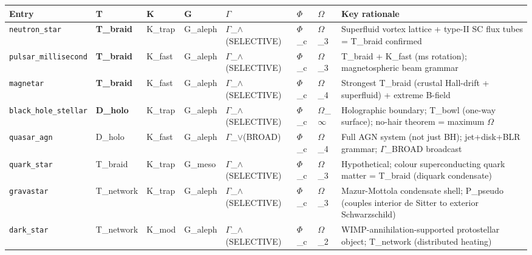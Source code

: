\documentclass[12pt,a4paper]{article}
\begin{document}
\begin{table}[htbp]
\centering
\small
{}
\begin{tabularx}{\textwidth}{>{\centering\arraybackslash}X >{\centering\arraybackslash}X >{\centering\arraybackslash}X >{\centering\arraybackslash}X >{\centering\arraybackslash}X >{\centering\arraybackslash}X >{\centering\arraybackslash}X >{\centering\arraybackslash}X}
\toprule
\rowcolor{gray!25}\textbf{Entry} & \textbf{T} & \textbf{K} & \textbf{G} & \textbf{$\Gamma$} & \textbf{$\Phi$} & \textbf{$\Omega$} & \textbf{Key rationale} \\
\midrule
\rowcolors{1}{white}{gray!10}
\texttt{neutron\_star} & \textbf{T\_braid} & K\_trap & G\_aleph & $\Gamma$\_$\land$(SELECTIVE) & $\Phi$\_c & $\Omega$\_3 & Superfluid vortex lattice + type-II SC flux tubes = T\_braid confirmed \\
\texttt{pulsar\_millisecond} & \textbf{T\_braid} & K\_fast & G\_aleph & $\Gamma$\_$\land$(SELECTIVE) & $\Phi$\_c & $\Omega$\_3 & T\_braid + K\_fast (ms rotation); magnetospheric beam grammar \\
\texttt{magnetar} & \textbf{T\_braid} & K\_fast & G\_aleph & $\Gamma$\_$\land$(SELECTIVE) & $\Phi$\_c & $\Omega$\_4 & Strongest T\_braid (crustal Hall-drift + superfluid) + extreme B-field \\
\texttt{black\_hole\_stellar} & \textbf{D\_holo} & K\_trap & G\_aleph & $\Gamma$\_$\land$(SELECTIVE) & $\Phi$\_c & $\Omega$\_$\infty$ & Holographic boundary; T\_bowl (one-way surface); no-hair theorem = maximum $\Omega$ \\
\texttt{quasar\_agn} & D\_holo & K\_fast & G\_aleph & $\Gamma$\_$\lor$(BROAD) & $\Phi$\_c & $\Omega$\_4 & Full AGN system (not just BH); jet+disk+BLR grammar; $\Gamma$\_BROAD broadcast \\
\texttt{quark\_star} & T\_braid & K\_trap & G\_meso & $\Gamma$\_$\land$(SELECTIVE) & $\Phi$\_c & $\Omega$\_3 & Hypothetical; colour superconducting quark matter = T\_braid (diquark condensate) \\
\texttt{gravastar} & T\_network & K\_trap & G\_aleph & $\Gamma$\_$\land$(SELECTIVE) & $\Phi$\_c & $\Omega$\_3 & Mazur-Mottola condensate shell; P\_pseudo (couples interior de Sitter to exterior Schwarzschild) \\
\texttt{dark\_star} & T\_network & K\_mod & G\_aleph & $\Gamma$\_$\land$(SELECTIVE) & $\Phi$\_c & $\Omega$\_2 & WIMP-annihilation-supported protostellar object; T\_network (distributed heating) \\
\bottomrule
\end{tabularx}
\end{table}
\end{document}
